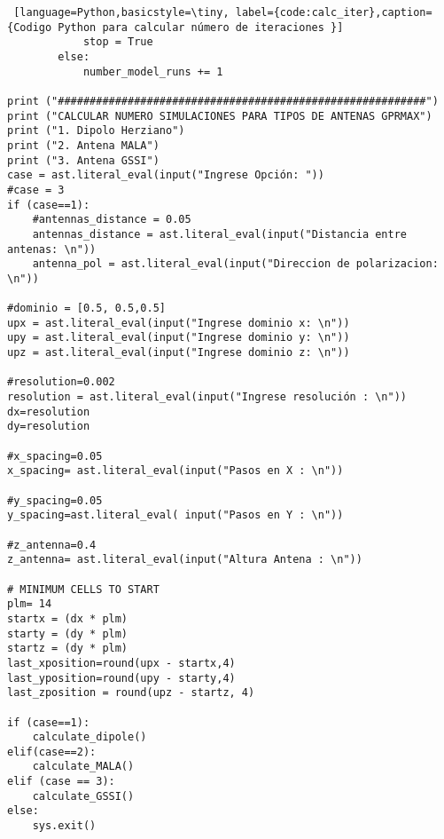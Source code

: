 \begin{lstlisting} [language=Python,basicstyle=\tiny, label={code:calc_iter},caption= {Codigo Python para calcular número de iteraciones }]
            stop = True
        else:
            number_model_runs += 1

print ("##########################################################")
print ("CALCULAR NUMERO SIMULACIONES PARA TIPOS DE ANTENAS GPRMAX")
print ("1. Dipolo Herziano")
print ("2. Antena MALA")
print ("3. Antena GSSI")
case = ast.literal_eval(input("Ingrese Opción: "))
#case = 3
if (case==1):
    #antennas_distance = 0.05
    antennas_distance = ast.literal_eval(input("Distancia entre antenas: \n"))
    antenna_pol = ast.literal_eval(input("Direccion de polarizacion: \n"))

#dominio = [0.5, 0.5,0.5]
upx = ast.literal_eval(input("Ingrese dominio x: \n"))
upy = ast.literal_eval(input("Ingrese dominio y: \n"))
upz = ast.literal_eval(input("Ingrese dominio z: \n"))

#resolution=0.002
resolution = ast.literal_eval(input("Ingrese resolución : \n"))
dx=resolution
dy=resolution

#x_spacing=0.05
x_spacing= ast.literal_eval(input("Pasos en X : \n"))

#y_spacing=0.05
y_spacing=ast.literal_eval( input("Pasos en Y : \n"))

#z_antenna=0.4
z_antenna= ast.literal_eval(input("Altura Antena : \n"))

# MINIMUM CELLS TO START
plm= 14
startx = (dx * plm)
starty = (dy * plm)
startz = (dy * plm)
last_xposition=round(upx - startx,4)
last_yposition=round(upy - starty,4)
last_zposition = round(upz - startz, 4)

if (case==1):
    calculate_dipole()
elif(case==2):
    calculate_MALA()
elif (case == 3):
    calculate_GSSI()
else:
    sys.exit()
\end{lstlisting}

\newpage


